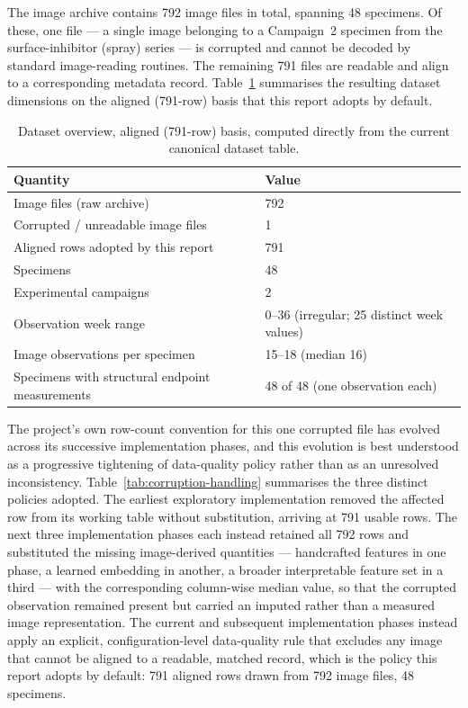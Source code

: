 The image archive contains 792 image files in total, spanning 48
specimens. Of these, one file — a single image belonging to a Campaign~2
specimen from the surface-inhibitor (spray) series — is corrupted and
cannot be decoded by standard image-reading routines. The remaining 791
files are readable and align to a corresponding metadata record.
Table~\ref{tab:dataset-overview} summarises the resulting dataset
dimensions on the aligned (791-row) basis that this report adopts by
default.

\begin{table}[htbp]
\centering
\caption{Dataset overview, aligned (791-row) basis, computed directly from
the current canonical dataset table.}
\label{tab:dataset-overview}
\begin{tabular}{ll}
\toprule
Quantity & Value \\
\midrule
Image files (raw archive) & 792 \\
Corrupted / unreadable image files & 1 \\
Aligned rows adopted by this report & 791 \\
Specimens & 48 \\
Experimental campaigns & 2 \\
Observation week range & 0--36 (irregular; 25 distinct week values) \\
Image observations per specimen & 15--18 (median 16) \\
Specimens with structural endpoint measurements & 48 of 48 (one
observation each) \\
\bottomrule
\end{tabular}
\end{table}

The project's own row-count convention for this one corrupted file has
evolved across its successive implementation phases, and this evolution
is best understood as a progressive tightening of data-quality policy
rather than as an unresolved inconsistency. Table~\ref{tab:corruption-handling}
summarises the three distinct policies adopted. The earliest exploratory
implementation removed the affected row from its working table without
substitution, arriving at 791 usable rows. The next three implementation
phases each instead retained all 792 rows and substituted the missing
image-derived quantities — handcrafted features in one phase, a learned
embedding in another, a broader interpretable feature set in a third —
with the corresponding column-wise median value, so that the corrupted
observation remained present but carried an imputed rather than a
measured image representation. The current and subsequent implementation
phases instead apply an explicit, configuration-level data-quality rule
that excludes any image that cannot be aligned to a readable, matched
record, which is the policy this report adopts by default: 791 aligned
rows drawn from 792 image files, 48 specimens.

